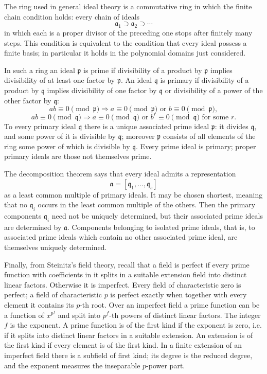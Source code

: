 \documentclass[11pt]{article}
\begin{document}
The ring used in general ideal theory is a commutative ring in which the finite chain condition holds: every chain of ideals
\[
  \mathfrak a_1\supset \mathfrak a_2\supset\cdots
\]
in which each is a proper divisor of the preceding one stops after finitely many steps. This condition is equivalent to the condition that every ideal possess a finite basis; in particular it holds in the polynomial domains just considered.

In such a ring an ideal $\mathfrak p$ is prime if divisibility of a product by $\mathfrak p$ implies divisibility of at least one factor by $\mathfrak p$. An ideal $\mathfrak q$ is primary if divisibility of a product by $\mathfrak q$ implies divisibility of one factor by $\mathfrak q$ or divisibility of a power of the other factor by $\mathfrak q$:
\[
  ab\equiv0\pmod{\mathfrak p}\Rightarrow a\equiv0\pmod{\mathfrak p}\text{ or }b\equiv0\pmod{\mathfrak p},
\]
\[
  ab\equiv0\pmod{\mathfrak q}\Rightarrow a\equiv0\pmod{\mathfrak q}\text{ or }b^r\equiv0\pmod{\mathfrak q}\text{ for some }r.
\]
To every primary ideal $\mathfrak q$ there is a unique associated prime ideal $\mathfrak p$: it divides $\mathfrak q$, and some power of it is divisible by $\mathfrak q$; moreover $\mathfrak p$ consists of all elements of the ring some power of which is divisible by $\mathfrak q$. Every prime ideal is primary; proper primary ideals are those not themselves prime.

The decomposition theorem says that every ideal admits a representation
\[
  \mathfrak a=[\mathfrak q_1,\ldots,\mathfrak q_s]
\]
as a least common multiple of primary ideals. It may be chosen shortest, meaning that no $\mathfrak q_i$ occurs in the least common multiple of the others. Then the primary components $\mathfrak q_i$ need not be uniquely determined, but their associated prime ideals are determined by $\mathfrak a$. Components belonging to isolated prime ideals, that is, to associated prime ideals which contain no other associated prime ideal, are themselves uniquely determined.

Finally, from Steinitz's field theory, recall that a field is perfect if every prime function with coefficients in it splits in a suitable extension field into distinct linear factors. Otherwise it is imperfect. Every field of characteristic zero is perfect; a field of characteristic $p$ is perfect exactly when together with every element it contains its $p$-th root. Over an imperfect field a prime function can be a function of $x^{p^f}$ and split into $p^f$-th powers of distinct linear factors. The integer $f$ is the exponent. A prime function is of the first kind if the exponent is zero, i.e. if it splits into distinct linear factors in a suitable extension. An extension is of the first kind if every element is of the first kind. In a finite extension of an imperfect field there is a subfield of first kind; its degree is the reduced degree, and the exponent measures the inseparable $p$-power part.
\end{document}
